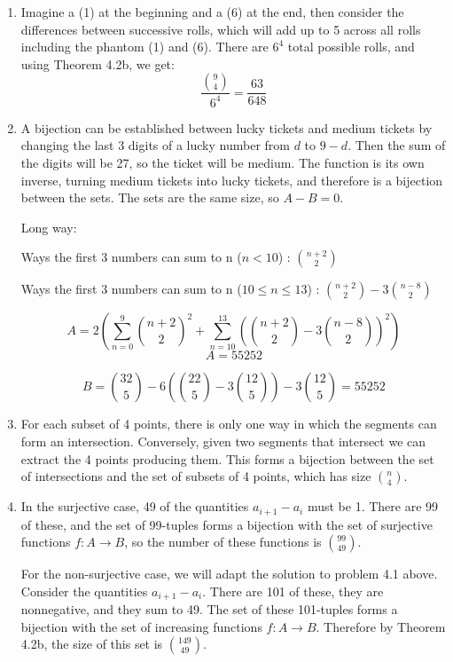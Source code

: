 \documentclass{book}
\numberwithin{equation}{section}
\begin{document}
\begin{enumerate}[label={4.\arabic*}]

\item
Imagine a (1) at the beginning and a (6) at the end, then consider the differences between successive
rolls, which will add up to 5 across all rolls including the phantom (1) and (6). There are $6^4$ total possible
rolls, and using Theorem 4.2b, we get:
$$\frac{{9 \choose 4}}{6^4} = \frac{63}{648}$$

\item
A bijection can be established between lucky tickets and medium tickets by changing the last 3 digits
of a lucky number from $d$ to $9-d$. Then the sum of the digits will be 27, so the ticket will be medium.
The function is its own inverse, turning medium tickets into lucky tickets, and therefore is a bijection between
the sets. The sets are the same size, so $A - B = 0$.

Long way:

Ways the first 3 numbers can sum to n ($n < 10$) : ${n+2 \choose 2}$

Ways the first 3 numbers can sum to n ($10 \leq n \leq 13$) : ${n+2 \choose 2} - 3{n-8 \choose 2}$

$$ A = 2 \left( \sum_{n=0}^9 {n+2 \choose 2}^2 + \sum_{n=10}^13 \left( {n+2 \choose 2} - 3{n-8 \choose 2} \right)^2 \right) $$
$$ A = 55252 $$

$$ B = {32 \choose 5} - 6 \left( {22 \choose 5} - 3{12 \choose 5} \right) - 3{12 \choose 5} = 55252 $$

\item
For each subset of 4 points, there is only one way in which the segments can form an intersection. Conversely,
given two segments that intersect we can extract the 4 points producing them. This forms a bijection between
the set of intersections and the set of subsets of 4 points, which has size ${n \choose 4}$.

\item
In the surjective case, 49 of the quantities $a_{i+1} - a_i$ must be 1. There are 99 of these, and the set of
99-tuples forms a bijection with the set of surjective functions $f : A \to B$, so the number of these functions
is ${99 \choose 49}$.

For the non-surjective case, we will adapt the solution to problem 4.1 above.
Consider the quantities $a_{i+1} - a_i$. There are 101 of these,
they are nonnegative, and they sum to 49. The set of these 101-tuples forms a bijection with the set of
increasing functions $f : A \to B$. Therefore by Theorem 4.2b, the size of this set is ${149 \choose 49}$.


\end{enumerate}
\end{document}
